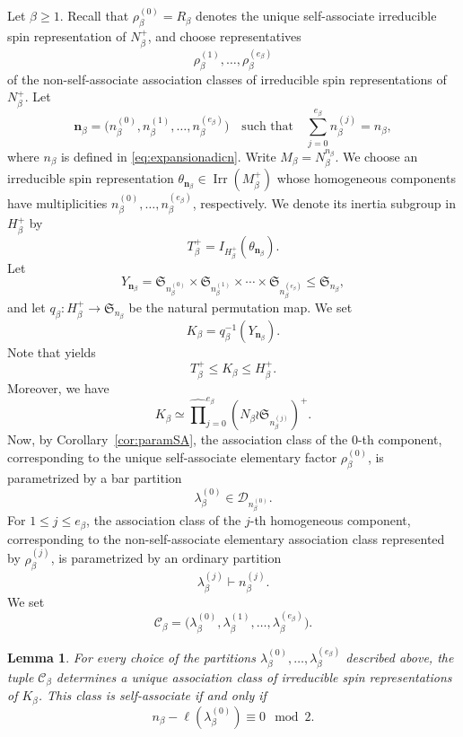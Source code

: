 \documentclass[reqno]{amsart}
\DeclareMathOperator{\Irr}{Irr}
\newcommand{\sym}{\mathfrak{S}}
\newtheorem{lemma}[theorem]{Lemma}     %
\theoremstyle{definition}
\begin{document}
Let $\beta\geq1$.
Recall that $\rho_\beta^{(0)}=R_\beta$ denotes the unique self-associate
irreducible spin representation of $N_\beta^+$, and choose representatives
\[
\rho_\beta^{(1)},\ldots,\rho_\beta^{(e_\beta)}
\]
of the non-self-associate association classes of irreducible spin
representations of $N_\beta^+$.
Let
\begin{equation}
\label{eq:profile}
\mathbf n_\beta
=
\bigl(
n_\beta^{(0)},n_\beta^{(1)},\ldots,n_\beta^{(e_\beta)}
\bigr)
\quad\text{such that}\quad
\sum_{j=0}^{e_\beta}n_\beta^{(j)}=n_\beta,
\end{equation}
where $n_\beta$ is defined in \eqref{eq:expansionadicn}.
Write $M_\beta=N_\beta^{n_\beta}$. We choose an irreducible spin representation
$
\theta_{\mathbf n_\beta}\in\Irr(M_\beta^+)
$
whose homogeneous components have multiplicities
$n_\beta^{(0)},\ldots,n_\beta^{(e_\beta)}$, respectively. We denote its
inertia subgroup in $H_\beta^+$ by
\[
T_\beta^+
=
I_{H_\beta^+}(\theta_{\mathbf n_\beta}).
\]
Let
\[
Y_{\mathbf n_\beta}
=
\sym_{n_\beta^{(0)}}\times
\sym_{n_\beta^{(1)}}\times\cdots\times
\sym_{n_\beta^{(e_\beta)}}
\leq
\sym_{n_\beta},
\]
and let
$
q_\beta:H_\beta^+\longrightarrow\sym_{n_\beta}
$
be the natural permutation map. We set
\[
K_\beta=q_\beta^{-1}(Y_{\mathbf n_\beta}).
\]
Note that \cite[Propositions~3.12 and~3.13]{MichlerOlsson} yields
\[
T_\beta^+\leq K_\beta\leq H_\beta^+.
\]
Moreover, we have
\[
K_\beta
\simeq
\widehat{\prod}_{j=0}^{e_\beta}
\left(
N_\beta\wr\sym_{n_\beta^{(j)}}
\right)^+.
\]
Now, by Corollary~\ref{cor:paramSA}, the association class of the
$0$-th component, corresponding to the unique self-associate elementary
factor $\rho_\beta^{(0)}$, is parametrized by a bar partition
\[
\lambda_\beta^{(0)}\in\mathcal D_{n_\beta^{(0)}}.
\]
For $1\leq j\leq e_\beta$, the association class of the $j$-th homogeneous
component, corresponding to the non-self-associate elementary
association class represented by $\rho_\beta^{(j)}$, is parametrized by an
ordinary partition
\[
\lambda_\beta^{(j)}\vdash n_\beta^{(j)}.
\]
We set
\[
\mathcal C_\beta
=
\bigl(
\lambda_\beta^{(0)},\lambda_\beta^{(1)},\ldots,
\lambda_\beta^{(e_\beta)}
\bigr).
\]

\begin{lemma}
\label{lem:typeQi}
For every choice of the partitions
$\lambda_\beta^{(0)},\ldots,\lambda_\beta^{(e_\beta)}$
described above, the tuple $\mathcal C_\beta$ determines a unique
association class of irreducible spin representations of $K_\beta$.
This class is self-associate if and only if
\[
n_\beta-\ell(\lambda_\beta^{(0)})\equiv0\mod2.
\]
\end{lemma}
\end{document}
